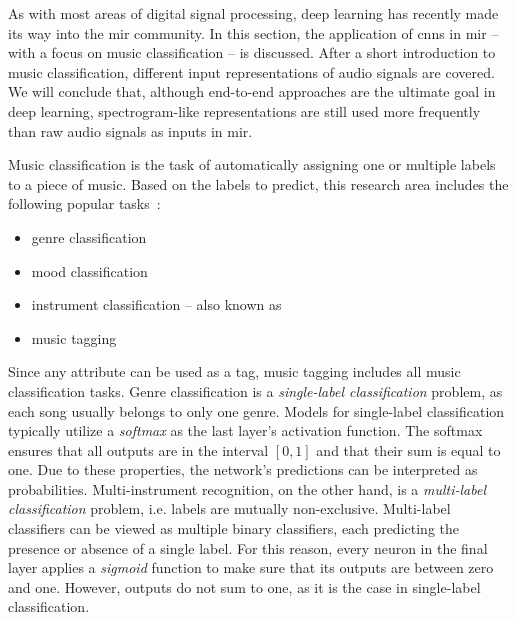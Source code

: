 As with most areas of digital signal processing, deep learning has recently made its way into the \gls{mir} community. In this section, the application of \glspl{cnn} in \gls{mir} -- with a focus on music classification -- is discussed. After a short introduction to music classification, different input representations of audio signals are covered. We will conclude that, although end-to-end approaches are the ultimate goal in deep learning, spectrogram-like representations are still used more frequently than raw audio signals as inputs in \gls{mir}.

Music classification is the task of automatically assigning one or multiple labels to a piece of music. Based on the labels to predict, this research area includes the following popular tasks~\cite{won2021book}:
\begin{itemize}
	\item genre classification
	\item mood classification
	\item instrument classification -- also known as \textit{}
	\item music tagging
\end{itemize}
Since any attribute can be used as a tag, music tagging includes all music classification tasks. Genre classification is a \textit{single-label classification} problem, as each song usually belongs to only one genre. Models for single-label classification typically utilize a \textit{softmax} as the last layer's activation function. The softmax ensures that all outputs are in the interval $[0, 1]$ and that their sum is equal to one. Due to these properties, the network's predictions can be interpreted as probabilities. Multi-instrument recognition, on the other hand, is a \textit{multi-label classification} problem, i.e. labels are mutually non-exclusive. Multi-label classifiers can be viewed as multiple binary classifiers, each predicting the presence or absence of a single label. For this reason, every neuron in the final layer applies a \textit{sigmoid} function to make sure that its outputs are between zero and one. However, outputs do not sum to one, as it is the case in single-label classification.

